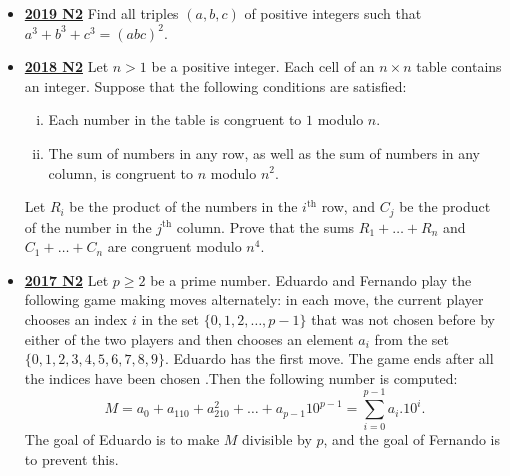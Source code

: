 \documentclass[11pt]{scrartcl}
\begin{document}
\begin{itemize}[leftmargin=*]
\item \href{https://artofproblemsolving.com/community/c6h2278999p17828751}{\textbf{2019 N2}} Find all triples $(a, b, c)$ of positive integers such that $a^3 + b^3 + c^3 = (abc)^2$.
\item \href{https://artofproblemsolving.com/community/c6h1876750p12752787}{\textbf{2018 N2}} 	Let $n>1$ be a positive integer. Each cell of an $n\times n$ table contains an integer. Suppose that the following conditions are satisfied:
\begin{enumerate}[(i)]
\item Each number in the table is congruent to $1$ modulo $n$.
\item The sum of numbers in any row, as well as the sum of numbers in any column, is congruent to $n$ modulo $n^2$.
 
\end{enumerate}
Let $R_i$ be the product of the numbers in the $i^{\text{th}}$ row, and $C_j$ be the product of the number in the $j^{\text{th}}$ column. Prove that the sums $R_1+\dots+ R_n$ and $C_1+\dots +C_n$ are congruent modulo $n^4$.
\newpage

\item \href{https://artofproblemsolving.com/community/c6h1671275p10632294}{\textbf{2017 N2}} Let $ p \geqslant  2$ be a prime number. Eduardo and Fernando play the following game making moves alternately: in each move, the current player chooses an index $i$ in the set $\{0,1,2,\dots, p-1 \}$ that was not chosen before by either of the two players and then chooses an element $a_i$ from the set $\{0,1,2,3,4,5,6,7,8,9\}$. Eduardo has the first move. The game ends after all the indices have been chosen .Then the following number is computed:
$$M=a_0+a_110+a_210^2+\dots+a_{p-1}10^{p-1}= \sum_{i=0}^{p-1}a_i.10^i.$$
The goal of Eduardo is to make $M$ divisible by $p$, and the goal of Fernando is to prevent this.


\end{itemize}
\end{document}
